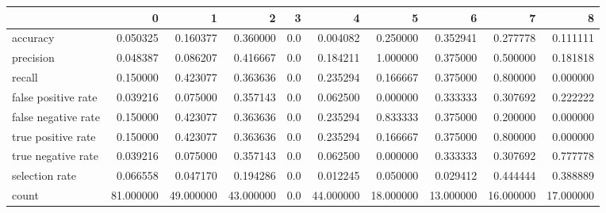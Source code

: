 \begin{tabular}{lrrrrrrrrr}
\toprule
{} &          0 &          1 &          2 &    3 &          4 &          5 &          6 &          7 &          8 \\
\midrule
accuracy            &   0.050325 &   0.160377 &   0.360000 &  0.0 &   0.004082 &   0.250000 &   0.352941 &   0.277778 &   0.111111 \\
precision           &   0.048387 &   0.086207 &   0.416667 &  0.0 &   0.184211 &   1.000000 &   0.375000 &   0.500000 &   0.181818 \\
recall              &   0.150000 &   0.423077 &   0.363636 &  0.0 &   0.235294 &   0.166667 &   0.375000 &   0.800000 &   0.000000 \\
false positive rate &   0.039216 &   0.075000 &   0.357143 &  0.0 &   0.062500 &   0.000000 &   0.333333 &   0.307692 &   0.222222 \\
false negative rate &   0.150000 &   0.423077 &   0.363636 &  0.0 &   0.235294 &   0.833333 &   0.375000 &   0.200000 &   0.000000 \\
true positive rate  &   0.150000 &   0.423077 &   0.363636 &  0.0 &   0.235294 &   0.166667 &   0.375000 &   0.800000 &   0.000000 \\
true negative rate  &   0.039216 &   0.075000 &   0.357143 &  0.0 &   0.062500 &   0.000000 &   0.333333 &   0.307692 &   0.777778 \\
selection rate      &   0.066558 &   0.047170 &   0.194286 &  0.0 &   0.012245 &   0.050000 &   0.029412 &   0.444444 &   0.388889 \\
count               &  81.000000 &  49.000000 &  43.000000 &  0.0 &  44.000000 &  18.000000 &  13.000000 &  16.000000 &  17.000000 \\
\bottomrule
\end{tabular}
